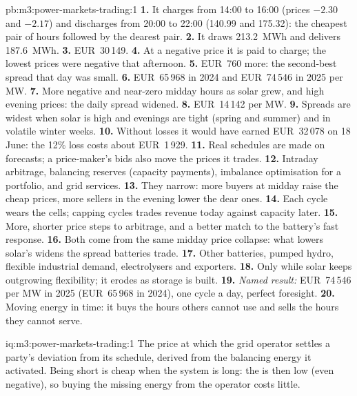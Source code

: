 \begin{solution}{pb:m3:power-markets-trading:1}
\textbf{1.} It charges from 14:00 to 16:00 (prices $-2.30$ and $-2.17$) and discharges from 20:00
to 22:00 (140.99 and 175.32): the cheapest pair of hours followed by the dearest pair.
\textbf{2.} It draws 213.2~MWh and delivers 187.6~MWh. \textbf{3.} EUR~30\,149. \textbf{4.} At a
negative price it is paid to charge; the lowest prices were negative that afternoon.
\textbf{5.} EUR~760 more: the second-best spread that day was small.
\textbf{6.} EUR~65\,968 in 2024 and EUR~74\,546 in 2025 per MW. \textbf{7.} More negative and
near-zero midday hours as solar grew, and high evening prices: the daily spread widened.
\textbf{8.} EUR~14\,142 per MW. \textbf{9.} Spreads are widest when solar is high and evenings
are tight (spring and summer) and in volatile winter weeks. \textbf{10.} Without losses it would
have earned EUR~32\,078 on 18 June: the 12\% loss costs about EUR~1\,929.
\textbf{11.} Real schedules are made on forecasts; a price-maker's bids also move the prices it
trades. \textbf{12.} Intraday arbitrage, balancing reserves (capacity payments), imbalance
optimisation for a portfolio, and grid services. \textbf{13.} They narrow: more buyers at midday
raise the cheap prices, more sellers in the evening lower the dear ones. \textbf{14.} Each cycle
wears the cells; capping cycles trades revenue today against capacity later. \textbf{15.} More,
shorter price steps to arbitrage, and a better match to the battery's fast response.
\textbf{16.} Both come from the same midday price collapse: what lowers solar's 
widens the spread batteries trade. \textbf{17.} Other batteries, pumped hydro, flexible industrial
demand, electrolysers and exporters. \textbf{18.} Only while solar keeps outgrowing flexibility;
it erodes as storage is built. \textbf{19.} \emph{Named result:} EUR~74\,546 per MW in 2025
(EUR~65\,968 in 2024), one cycle a day, perfect foresight. \textbf{20.} Moving energy in time:
it buys the hours others cannot use and sells the hours they cannot serve.
\end{solution}

\begin{solution}{iq:m3:power-markets-trading:1}
The price at which the grid operator settles a party's deviation from its schedule, derived from
the balancing energy it activated. Being short is cheap when the system is long: the  is then low (even negative), so buying the missing energy from the operator costs little.
\end{solution}

